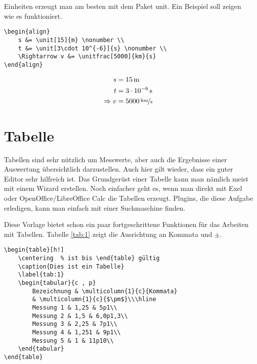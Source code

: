 Einheiten erzeugt man am besten mit dem Paket unit. Ein Beispiel soll zeigen wie es funktioniert.

\begin{verbatim}
\begin{align}
    s &= \unit[15]{m} \nonumber \\
    t &= \unit[3\cdot 10^{-6}]{s} \nonumber \\
    \Rightarrow v &= \unitfrac[5000]{km}{s}
\end{align}
\end{verbatim}

\begin{align}
    s &= \unit[15]{m} \nonumber \\
    t &= \unit[3\cdot 10^{-6}]{s} \nonumber \\
    \Rightarrow v &= \unitfrac[5000]{km}{s}
\end{align}

\section{Tabelle}

Tabellen sind sehr nützlich um Messwerte, aber auch die Ergebnisse einer Auswertung übersichtlich darzustellen. Auch hier gilt wieder, dass ein guter Editor sehr hilfreich ist. Das Grundgerüst einer Tabelle kann man nämlich meist mit einem Wizard erstellen. Noch einfacher geht es, wenn man direkt mit Exel oder OpenOffice/LibreOffice Calc die Tabellen erzeugt. Plugins, die diese Aufgabe erledigen, kann man einfach mit einer Suchmaschine finden.

Diese Vorlage bietet schon ein paar fortgeschrittene Funktionen für das Arbeiten mit Tabellen. Tabelle \ref{tab:1} zeigt die Ausrichtung an Kommata und $\pm$.

\begin{verbatim}
\begin{table}[h!]
    \centering	% ist bis \end{table} gültig
    \caption{Dies ist ein Tabelle}
    \label{tab:1}
    \begin{tabular}{c , p}
        Bezeichnung & \multicolumn{1}{c}{Kommata}
        & \multicolumn{1}{c}{$\pm$}\\\hline
        Messung 1 & 1,25 & 5p1\\
        Messung 2 & 1,5 & 6,0p1,3\\
        Messung 3 & 2,25 & 7p1\\
        Messung 4 & 1,251 & 9p1\\
        Messung 5 & 1 & 11p10\\
    \end{tabular}
\end{table}
\end{verbatim}

